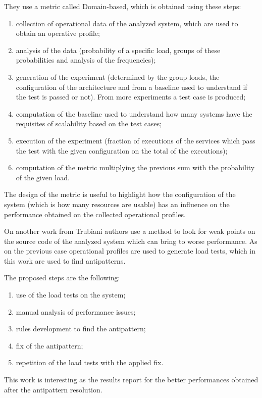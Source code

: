 They use a metric called Domain-based, which is obtained using these steps:
\begin{enumerate}
    \item collection of operational data of the analyzed system, which are used to obtain an operative profile;
    \item analysis of the data (probability of a specific load, groups of these probabilities and analysis of the frequencies);
    \item generation of the experiment (determined by the group loads, the configuration of the architecture and from a baseline used to understand if the test is passed or not). From more experiments a test case is produced;
    \item computation of the baseline used to understand how many systems have the requisites of scalability based on the test cases;
    \item execution of the experiment (fraction of executions of the services which pass the test with the given configuration on the total of the executions);
    \item computation of the metric multiplying the previous sum with the probability of the given load.
\end{enumerate}

The design of the metric is useful to highlight how the configuration of the system (which is how many resources are usable) has an influence on the performance obtained on the collected operational profiles.

On another work from Trubiani \parencite{trubiani2018exploiting} authors use a method to look for weak points on the source code of the analyzed system which can bring to worse performance.
As on the previous case operational profiles are used to generate load tests, which in this work are used to find antipatterns.

The proposed steps are the following:
\begin{enumerate}
    \item use of the load tests on the system;
    \item manual analysis of performance issues;
    \item rules development to find the antipattern;
    \item fix of the antipattern;
    \item repetition of the load tests with the applied fix.
\end{enumerate}

This work is interesting as the results report for the better performances obtained after the antipattern resolution.



